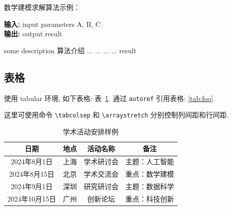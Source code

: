 \documentclass[bwprint,fontset=fandol]{gmcmthesis}
\begin{document}
数学建模求解算法示例：
\begin{center}
\begin{minipage}{0.8\textwidth}
\begin{algorithm}[H]%
\caption{算法的名字} %
{\bf 输入:} %
input parameters A, B, C\\
{\bf 输出:} %
output result
\begin{algorithmic}[1]
\State some description 算法介绍 %
  \State ...
    \State ...
  \Else
    \State ...
  \EndIf
\EndFor
{} %
  \State ...
\EndWhile
\State \Return result
\end{algorithmic}
\end{algorithm}
\end{minipage}
\end{center}
\vspace{2ex}

\subsection{表格}

使用 tabular 环境, 如下表格: 表~\ref{tab:foo}. 通过 \verb|autoref| 引用表格: \autoref{tab:foo}.

这里可使用命令 \verb|\tabcolsep| 和 \verb|\arraystretch| 分别控制列间距和行间距.

\begin{table}[htp!]
\centering
\setlength{\tabcolsep}{12pt}  %
\renewcommand{\arraystretch}{1.2}
\caption{学术活动安排样例}
\label{tab:foo}
\begin{tabular}{|c|c|c|c|}
\hline
\textbf{日期}  & \textbf{地点} & \textbf{活动名称} & \textbf{备注} \\ \hline
2024年8月1日      & 上海       & 学术研讨会      & 主题：人工智能 \\ \hline
2024年8月15日    & 北京       & 学术交流会      & 重点：数学建模 \\ \hline
2024年9月1日      & 深圳       & 研究研讨会      & 主题：数据科学 \\ \hline
2024年10月15日  & 广州       & 创新论坛         & 重点：科技创新 \\ \hline
\end{tabular}
\end{table}
\end{document}
